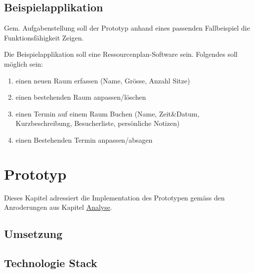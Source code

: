 \documentclass[oneside,11pt,parskip=half,ngerman]{scrreprt}
\begin{document}
\section{Beispielapplikation}\label{beispielapplikation}

Gem. Aufgabenstellung soll der Prototyp anhand eines passenden
Fallbeispiel die Funktionsfähigkeit Zeigen.

Die Beispielapplikation soll eine Ressourcenplan-Software sein.
Folgendes soll möglich sein:

\begin{enumerate}
\def\labelenumi{\arabic{enumi}.}
\itemsep1pt\parskip0pt
\item
  einen neuen Raum erfassen (Name, Grösse, Anzahl Sitze)
\item
  einen bestehenden Raum anpassen/löschen
\item
  einen Termin auf einem Raum Buchen (Name, Zeit\&Datum,
  Kurzbeschreibung, Besucherliste, persönliche Notizen)
\item
  einen Bestehenden Termin anpassen/absagen
\end{enumerate}

\chapter{Prototyp}\label{prototyp}

Dieses Kapitel adressiert die Implementation des Prototypen gemäss den
Anroderungen aus Kapitel \hyperref[analyse]{Analyse}.

\section{Umsetzung}\label{umsetzung}

\section{Technologie Stack}\label{technologie-stack}
\end{document}
